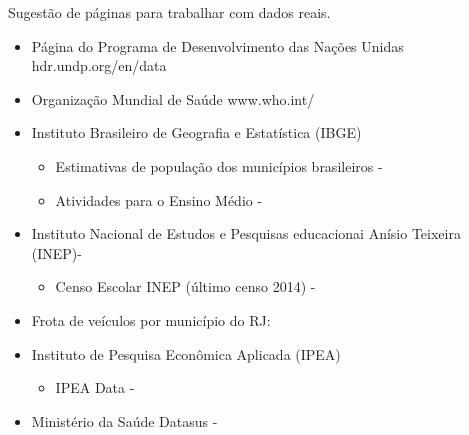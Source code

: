 Sugestão de páginas para trabalhar com dados reais.
\begin{itemize}
\item {} 
Página do Programa de Desenvolvimento das Nações Unidas \textendash{} hdr.undp.org/en/data

\item {} 
Organização Mundial de Saúde \textendash{} www.who.int/

\item {} 
Instituto Brasileiro de Geografia e Estatística (IBGE) \textendash{} 
\begin{itemize}
\item {} 
Estimativas de população dos municípios brasileiros - 

\item {} 
Atividades para o Ensino Médio - 

\end{itemize}

\item {} 
Instituto Nacional de Estudos e Pesquisas educacionai Anísio Teixeira (INEP)-  
\begin{itemize}
\item {} 
Censo Escolar INEP (último censo 2014) - 

\end{itemize}

\item {} 
Frota de veículos por município do RJ: 

\item {} 
Instituto de Pesquisa Econômica Aplicada (IPEA) \textendash{} 
\begin{itemize}
\item {} 
IPEA Data - 

\end{itemize}

\item {} 
Ministério da Saúde \textendash{} Datasus - 

\end{itemize}


